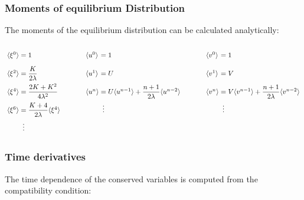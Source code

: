 \documentclass[
	pdftex,             %
	12pt,				%
	a4paper,		   	%
	english,				%
	oneside,			%
]{article}
\newcommand{\mom}[1]{\langle #1 \rangle}
\begin{document}
\subsubsection{Moments of equilibrium Distribution}

The moments of the equilibrium distribution can be calculated analytically:

\begin{equation}
\arraycolsep=1.4pt\def\arraystretch{2.2}
\begin{array}{lllll}
    \begin{array}{lcl}
        \mom{\xi^0} &=& 1 \\
        \mom{\xi^2} &=& \dfrac{K}{2 \lambda} \\
        \mom{\xi^4} &=& \dfrac{2K + K^2}{4\lambda^2} \\
        \mom{\xi^6} &=& \dfrac{K+4}{2 \lambda} \mom{\xi^4} \\
        ~&\vdots&~
    \end{array}
    &\hspace{1cm}&
    \begin{array}{lcl}
        \mom{u^0} &=& 1 \\
        \mom{u^1} &=& U \\
        \mom{u^n} &=& U \mom{u^{n-1}} + \dfrac{n+1}{2 \lambda} \mom{u^{n-2}} \\
        ~&\vdots&~ \\
        ~&~&~
    \end{array}
    &\hspace{1cm}&
    \begin{array}{lcl}
        \mom{v^0} &=& 1 \\
        \mom{v^1} &=& V \\
        \mom{v^n} &=& V \mom{v^{n-1}} + \dfrac{n+1}{2 \lambda} \mom{v^{n-2}} \\
        ~&\vdots&~ \\
        ~&~&~
    \end{array}
\end{array}
\end{equation}

\subsubsection{Time derivatives}

The time dependence of the conserved variables is computed from the compatibility condition:
\end{document}
